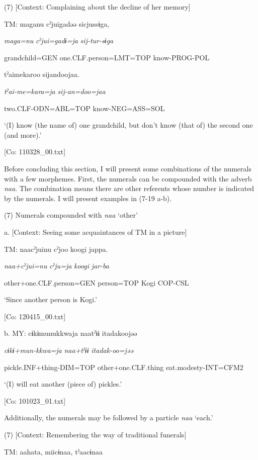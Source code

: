 (7)  [Context: Complaining about the decline of her memory]

  TM:  maganu  cˀjuigadəə  sicjussɨga,

    \textit{maga=nu}  \textit{cˀjui=gadɨ=ja}  \textit{sij-tur-sɨga}

    grandchild=GEN  one.CLF.person=LMT=TOP  know-PROG-POL

    tˀaimekaroo  sijandoojaa.

    \textit{tˀai-me=kara=ja}  \textit{sij-an=doo=jaa}

    two.CLF-ODN=ABL=TOP  know-NEG=ASS=SOL

    ‘(I) know (the name of) one grandchild, but don’t know (that of) the second one (and more).’

    [Co: 110328\_00.txt]

Before concluding this section, I will present some combinations of the numerals with a few morphemes. First, the numerals can be compounded with the adverb \textit{naa}. The combination means there are other referents whose number is indicated by the numerals. I will present examples in (7-19 a-b).

(7)  Numerals compounded with \textit{naa} ‘other’

  a.  [Context: Seeing some acquaintances of TM in a picture]

    TM:  naacˀjuinu  cˀjoo  koogi  jappa.

      \textit{naa+cˀjui=nu}  \textit{cˀju=ja}  \textit{koogi}  \textit{jar-ba}

      other+one.CLF.person=GEN  person=TOP  Kogi  COP-CSL

      ‘Since another person is Kogi.’

      [Co: 120415\_00.txt]

  b.  MY:  cɨkɨmunukkwaja  naatˀɨɨ  {\textbar}itadak{\textbar}oojəə

      \textit{cɨkɨ+mun-kkwa=ja}  \textit{naa+tˀɨɨ}  \textit{itadak-oo=jəə}

      pickle.INF+thing-DIM=TOP  other+one.CLF.thing  eat.modesty-INT=CFM2

      ‘(I) will eat another (piece of) pickles.’

      [Co: 101023\_01.txt]

  Additionally, the numerals may be followed by a particle \textit{naa} ‘each.’

(7)  [Context: Remembering the way of traditional funerals]

  TM:  aahata,  miicɨnaa,  tˀaacɨnaa

